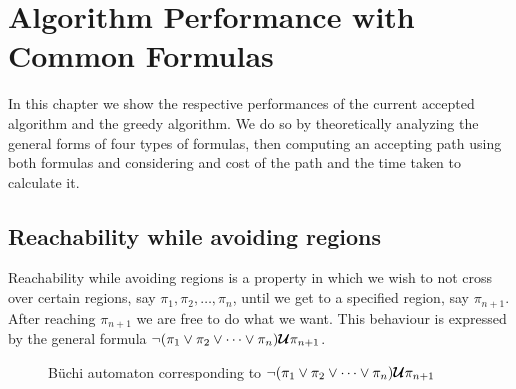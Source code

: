 \chapter{Algorithm Performance with Common Formulas}
In this chapter we show the respective performances of the current accepted algorithm and the greedy algorithm. We do so by theoretically analyzing the general forms of four types of formulas, then computing an accepting path using both formulas and considering and cost of the path and the time taken to calculate it.%




\section{Reachability while avoiding regions} 
Reachability while avoiding regions is a property in which we wish to not cross over certain regions, say $\pi_1, \pi_2, \dots, \pi_n$, until we get to a specified region, say $\pi_{n+1}$. After reaching $\pi_{n+1}$ we are free to do what we want. This behaviour is expressed by the general formula $\neg (\pi_1 \lor \pi_2 \lor \dots \lor \pi_n) \bm{\mathcal{U}} \pi_{n+1}$. 

\begin{figure}
\centering
{}
\caption{B\"{u}chi automaton corresponding to $\neg (\pi_1 \lor \pi_2 \lor \dots \lor \pi_n) \bm{\mathcal{U}} \pi_{n+1}$}
\label{fig:ReachAvoid}
\end{figure}

